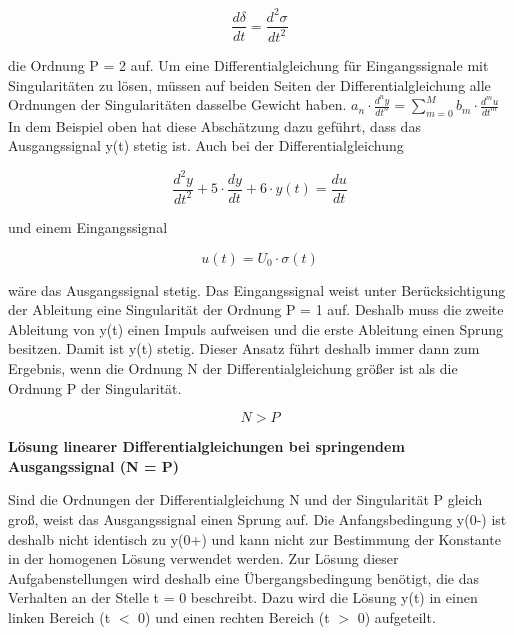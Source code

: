 \begin{equation}\label{eq:hundredthree}
\frac{d\delta }{dt} =\frac{d^{2} \sigma }{dt^{2} }
\end{equation}

\noindent die Ordnung P = 2 auf. Um eine Differentialgleichung für Eingangssignale mit Singularitäten zu lösen, müssen auf beiden Seiten der Differentialgleichung alle Ordnungen der Singularitäten dasselbe Gewicht haben. $a_{n} \cdot \frac{d^{n} y}{dt^{n} } =\sum _{m=0}^{M}b_{m} \cdot \frac{d^{m} u}{dt^{m} }  $In dem Beispiel oben hat diese Abschätzung dazu geführt, dass das Ausgangssignal y(t) stetig ist. Auch bei der Differentialgleichung 

\begin{equation}\label{eq:hundredfour}
\frac{d^{2} y}{dt^{2} } +5\cdot \frac{dy}{dt} +6\cdot y\left(t\right)=\frac{du}{dt}
\end{equation}

\noindent und einem Eingangssignal 

\begin{equation}\label{eq:hundredfive}
u\left(t\right)=U_{0} \cdot \sigma \left(t\right)
\end{equation}

\noindent wäre das Ausgangssignal stetig. Das Eingangssignal weist unter Berücksichtigung der Ableitung eine Singularität der Ordnung P = 1 auf. Deshalb muss die zweite Ableitung von y(t) einen Impuls aufweisen und die erste Ableitung einen Sprung besitzen. Damit ist y(t) stetig. Dieser Ansatz führt deshalb immer dann zum Ergebnis, wenn die Ordnung N der Differentialgleichung grö{\ss}er ist als die Ordnung P der Singularit\"{a}t.

\begin{equation}\label{eq:hundredsix}
N>P
\end{equation}\medskip

{\selectfont
\noindent\textbf{Lösung linearer Differentialgleichungen bei springendem Ausgangssignal (N = P)}}

\noindent Sind die Ordnungen der Differentialgleichung N und der Singularität P gleich gro{\ss}, weist das Ausgangssignal einen Sprung auf. Die Anfangsbedingung y(0-) ist deshalb nicht identisch zu y(0+) und kann nicht zur Bestimmung der Konstante in der homogenen Lösung verwendet werden. Zur Lösung dieser Aufgabenstellungen wird deshalb eine Übergangsbedingung benötigt, die das Verhalten an der Stelle t = 0 beschreibt. Dazu wird die Lösung y(t) in einen linken Bereich (t $\mathrm{<}$ 0) und einen rechten Bereich (t $\mathrm{>}$ 0) aufgeteilt. 

